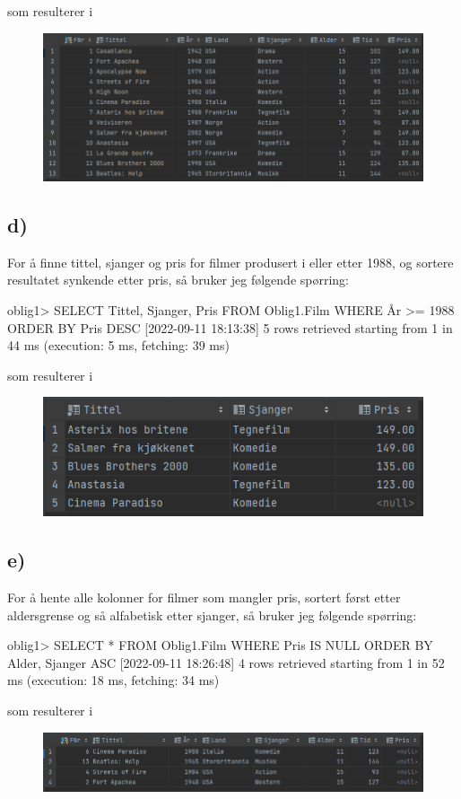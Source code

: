 \documentclass[%
notitlepage,
 amsmath,amssymb,
 aps,
rmp,
]{revtex4-2}  %
\begin{document}
\newpage
som resulterer i
\begin{figure}[H]
\centering\includegraphics[width=\columnwidth]{op1c.png}
\end{figure}

\subsection*{d)}
For å finne tittel, sjanger og pris for filmer produsert i eller etter 1988, og sortere resultatet synkende etter pris, så bruker jeg følgende spørring:
\begin{sql}
oblig1> SELECT Tittel, Sjanger, Pris
        FROM Oblig1.Film
        WHERE År >= 1988
        ORDER BY Pris DESC
[2022-09-11 18:13:38] 5 rows retrieved starting from 1 in 44 ms (execution: 5 ms, fetching: 39 ms)
\end{sql}
som resulterer i
\begin{figure}[H]
\centering\includegraphics[scale=1]{op1d.png}
\end{figure}

\subsection*{e)}
For å hente alle kolonner for filmer som mangler pris, sortert først etter aldersgrense og så alfabetisk etter sjanger, så bruker jeg følgende spørring:
\begin{sql}
oblig1> SELECT * FROM Oblig1.Film
        WHERE Pris IS NULL
        ORDER BY Alder, Sjanger ASC
[2022-09-11 18:26:48] 4 rows retrieved starting from 1 in 52 ms (execution: 18 ms, fetching: 34 ms)
\end{sql}
\newpage
som resulterer i
\begin{figure}[H]
\centering\includegraphics[width=\columnwidth]{op1e.png}
\end{figure}
\end{document}
